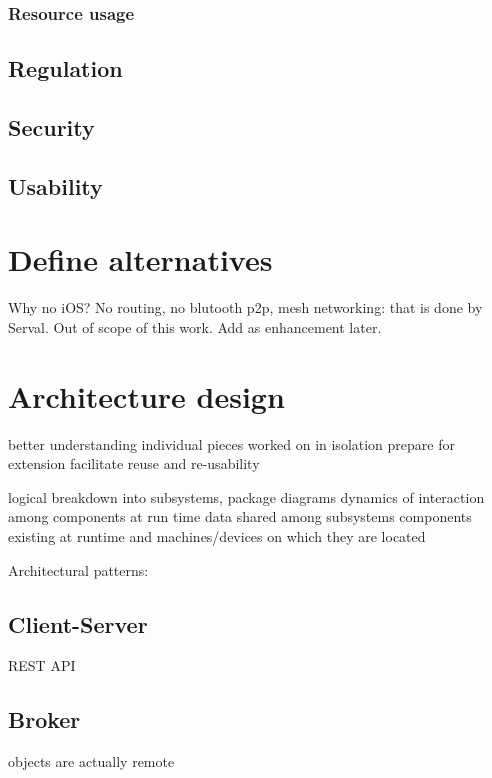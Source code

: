 \subsubsection{Resource usage}

\subsection{Regulation}

\subsection{Security}

\subsection{Usability}





\section{Define alternatives} %



Why no iOS?
No routing, no blutooth p2p, mesh networking: that is done by Serval. Out of scope of this work. Add as enhancement later.


\section{Architecture design}

better understanding
individual pieces worked on in isolation
prepare for extension
facilitate reuse and re-usability

logical breakdown into subsystems, package diagrams
dynamics of interaction among components at run time
data shared among subsystems
components existing at runtime and machines/devices on which they are located

Architectural patterns:

\subsection{Client-Server}
REST API

\subsection{Broker}
objects are actually remote

